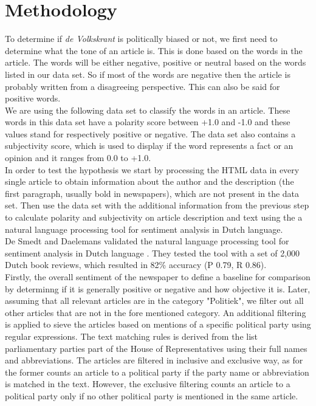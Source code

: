 \section{Methodology}
To determine if {\it de Volkskrant} is politically biased or not, we first need to determine what the tone of an article is. This is done based on the words in the article. The words will be either negative, positive or neutral based on the words listed in our data set. So if most of the words are negative then the article is probably written from a disagreeing perspective. This can also be said for positive words. \\

We are using the following data set\cite{sub:words} to classify the words in an article. These words in this data set have a polarity score between +1.0 and -1.0 and  these values stand for respectively positive or negative. The data set also contains a subjectivity score, which is used to display if the word represents a fact or an opinion and it ranges from 0.0 to +1.0. \\

In order to test the hypothesis we start by processing the HTML data in every single article to obtain information about the author and the description (the first paragraph, usually bold in newspapers), which are not present in the data set. Then use the data set with the additional information from the previous step to calculate polarity and subjectivity on article description and text using the a natural language processing tool for sentiment analysis in Dutch language\cite{tool:pattern.nl}. \\

De Smedt and Daelemans \cite{validate:tool} validated the natural language processing tool for sentiment analysis in Dutch language \cite{tool:pattern.nl}. They tested the tool with a set of 2,000 Dutch book reviews, which resulted in 82\% accuracy (P 0.79, R 0.86).  \\

Firstly, the overall sentiment of the newspaper to define a baseline for comparison by determinng if it is generally positive or negative and how objective it is. Later, assuming that all relevant articles are in the category "Politiek", we filter out all other articles that are not in the fore mentioned category. An additional filtering is applied to sieve the articles based on mentions of a specific political party using regular expressions. The text matching rules is derived from the list parliamentary parties part of the House of Representatives\cite{web:parliamentary-parties} using their full names and abbreviations. The articles are filtered in inclusive and exclusive way, as for the former counts an article to a political party if the party name or abbreviation is matched in the text. However, the exclusive filtering counts an article to a political party only if no other political party is mentioned in the same article.

